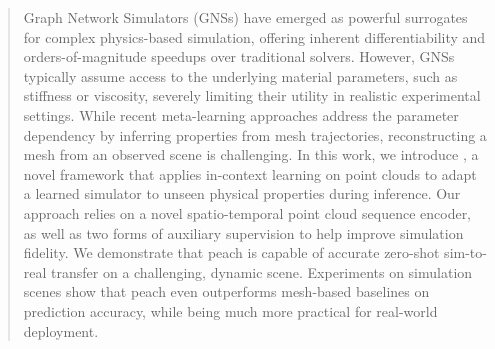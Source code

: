 \begin{abstract}
Graph Network Simulators (GNSs) have emerged as powerful surrogates for complex physics-based simulation, offering inherent differentiability and orders-of-magnitude speedups over traditional solvers. 
However, GNSs typically assume access to the underlying material parameters, such as stiffness or viscosity, 
severely limiting their utility in realistic experimental settings.
While recent meta-learning approaches address the parameter dependency by inferring properties from mesh trajectories, reconstructing a mesh from an observed scene is challenging.
In this work, we introduce , a novel framework that applies in-context learning on point clouds to adapt a learned simulator to unseen physical properties during inference.
Our approach relies on a novel spatio-temporal point cloud sequence encoder, as well as two forms of auxiliary supervision to help improve simulation fidelity.
We demonstrate that \gls{peach} is capable of accurate zero-shot sim-to-real transfer on a challenging, dynamic scene.
Experiments on simulation scenes show that \gls{peach} even outperforms mesh-based baselines on prediction accuracy, while being much more practical for real-world deployment.

\end{abstract}
